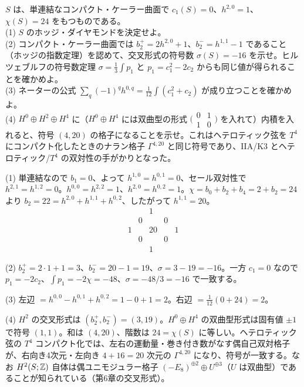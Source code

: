 \begin{problem}[難易度 B]\label{ch10-prob-k3}
 $S$ は、単連結なコンパクト・ケーラー曲面で $c_1(S)=0$、$h^{2,0}=1$、$\chi(S)=24$ をもつものである。\\
(1) $S$ のホッジ・ダイヤモンドを決定せよ。\\
(2) コンパクト・ケーラー曲面では $b_2^+=2h^{2,0}+1$、$b_2^-=h^{1,1}-1$ であること（ホッジの指数定理）を認めて、交叉形式の符号数 $\sigma(S)=-16$ を示せ。ヒルツェブルフの符号数定理 $\sigma=\frac13\int p_1$ と $p_1=c_1^2-2c_2$ からも同じ値が得られることを確かめよ。\\
(3) ネーターの公式 $\sum_q(-1)^qh^{0,q}=\frac{1}{12}\int(c_1^2+c_2)$ が成り立つことを確かめよ。\\
(4) $H^0\oplus H^2\oplus H^4$ に（$H^0\oplus H^4$ には双曲型の形式 $\bigl(\begin{smallmatrix}0&1\\1&0\end{smallmatrix}\bigr)$ を入れて）内積を入れると、符号 $(4,20)$ の格子になることを示せ。これはヘテロティック弦を $T^4$ にコンパクト化したときのナラン格子 $\Gamma^{4,20}$ と同じ符号であり、IIA/K3 とヘテロティック/$T^4$ の双対性の手がかりとなった。
\end{problem}

\begin{solution}
(1) 単連結なので $b_1=0$、よって $h^{1,0}=h^{0,1}=0$、セール双対性で $h^{2,1}=h^{1,2}=0$。$h^{0,0}=h^{2,2}=1$、$h^{2,0}=h^{0,2}=1$。$\chi=b_0+b_2+b_4=2+b_2=24$ より $b_2=22=h^{2,0}+h^{1,1}+h^{0,2}$、したがって $h^{1,1}=20$。
\[
\begin{matrix}&&1&&\\&0&&0&\\1&&20&&1\\&0&&0&\\&&1&&\end{matrix}
\]

(2) $b_2^+=2\cdot1+1=3$、$b_2^-=20-1=19$、$\sigma=3-19=-16$。一方 $c_1=0$ なので $p_1=-2c_2$、$\int p_1=-2\chi=-48$、$\sigma=-48/3=-16$ で一致する。

(3) 左辺 $=h^{0,0}-h^{0,1}+h^{0,2}=1-0+1=2$。右辺 $=\frac{1}{12}(0+24)=2$。

(4) $H^2$ の交叉形式は $(b_2^+,b_2^-)=(3,19)$。$H^0\oplus H^4$ の双曲型形式は固有値 $\pm1$ で符号 $(1,1)$。和は $(4,20)$、階数は $24=\chi(S)$ に等しい。ヘテロティック弦の $T^4$ コンパクト化では、左右の運動量・巻き付き数がなす偶自己双対格子が、右向き4次元・左向き $4+16=20$ 次元の $\Gamma^{4,20}$ になり、符号が一致する。なお $H^2(S;\mathbb{Z})$ 自体は偶ユニモジュラー格子 $(-E_8)^{\oplus2}\oplus U^{\oplus3}$（$U$ は双曲型）であることが知られている（第6章の交叉形式）。
\end{solution}

